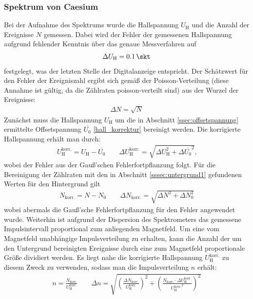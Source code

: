 \documentclass[11pt, a4paper]{article}
\numberwithin{equation}{section}
\begin{document}
\subsubsection{Spektrum von Caesium}
\label{sssec:spektrum_caesium}
Bei der Aufnahme des Spektrums wurde die Hallspannung $U_\mathrm{H}$ und die Anzahl der Ereignisse $N$ gemessen.
Dabei wird der Fehler der gemessenen Hallspannung aufgrund fehlender Kenntnis über das genaue Messverfahren auf
\begin{align*}
	\Delta U_\mathrm{H} = \SI{0.1}{\skt}
\end{align*}
festgelegt, was der letzten Stelle der Digitalanzeige entspricht.
Der Schätzwert für den Fehler der Ereigniszahl ergibt sich gemäß der Poisson-Verteilung (diese Annahme ist gültig, da die Zählraten poisson-verteilt sind) aus der Wurzel der Ereignisse:
\begin{align*}
	\Delta N = \sqrt{N}
\end{align*}
Zunächst muss die Hallspannung $U_\mathrm{H}$ um die in Abschnitt \ref{ssec:offsetspannung} ermittelte Offsetspannung $\overline{U_0}$ \eqref{hall_korrektur} bereinigt werden.
Die korrigierte Hallspannung erhält man durch:
\begin{align}
U_\mathrm{H}^\mathrm{korr.} = U_\mathrm{H} - \overline{U_0} \qquad
\Delta U_\mathrm{H}^\mathrm{korr.} = \sqrt{\Delta U_\mathrm{H}^2 + \Delta \overline{U_0}^2} \text{,}
\end{align}
wobei der Fehler aus der Gauß'schen Fehlerfortpflanzung folgt.
Für die Bereinigung der Zählraten mit den in Abschnitt \ref{sssec:untergrund1} gefundenen Werten für den Hintergrund gilt
\begin{align}
	N_\mathrm{korr.} = N - N_0 \qquad \Delta N_\mathrm{korr.} = \sqrt{\Delta N^2 + \Delta N_0^2}
\end{align}
wobei abermals die Gauß'sche Fehlerfortpflanzung für den Fehler angewendet wurde.
Weiterhin ist aufgrund der Dispersion des Spektrometers das gemessene Impulsintervall proportional zum anliegenden Magnetfeld.
Um eine vom Magnetfeld unabhängige Impulsverteilung zu erhalten, kann die Anzahl der um den Untergrund bereinigten Ereignisse durch eine zum Magnetfeld proportionale Größe dividiert werden.
Es liegt nahe die korrigierte Hallspannung $U_\mathrm{H}^\mathrm{korr.}$ zu diesem Zweck zu verwenden, sodass man die Impulsverteilung $n$ erhält:
\begin{align}
	n = \frac{N_\mathrm{korr.}}{U_\mathrm{H}^\mathrm{korr.}} \qquad \Delta n = \sqrt{\left( \frac{\Delta N_\mathrm{korr.}}{U_\mathrm{H}^\mathrm{korr.}}\right)^2 + \left( \frac{N_\mathrm{korr.} \cdot \Delta U_\mathrm{H}^\mathrm{korr.}}{ {U_\mathrm{H}^\mathrm{korr.}}^2 }\right)^2}
\end{align}
\end{document}
